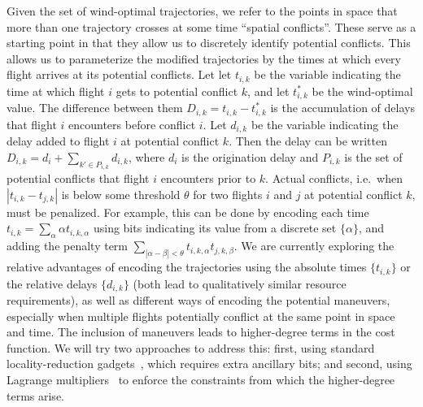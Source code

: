 Given the set of wind-optimal trajectories, we refer to the points in space that more than one trajectory crosses at some time ``spatial conflicts''.
These serve as a starting point in that they allow us to discretely identify potential conflicts.
This allows us to parameterize the modified trajectories by the times at which every flight arrives at its potential conflicts.
Let let $t_{i,k}$ be the variable indicating the time at which flight $i$ gets to potential conflict $k$, and let $t_{i,k}^*$ be the wind-optimal value.
The difference between them $D_{i,k} = t_{i,k} - t^*_{i,k}$ is the accumulation of delays that flight $i$ encounters before conflict $i$.
Let $d_{i,k}$ be the variable indicating the delay added to flight $i$ at potential conflict $k$.
Then the delay can be written $D_{i,k} = d_i + \sum_{k' \in P_{i,k}} d_{i,k}$, where $d_i$ is the origination delay and $P_{i,k}$ is the set of potential conflicts that flight $i$ encounters prior to $k$.
Actual conflicts, i.e.\ when $|t_{i,k} - t_{j,k}|$ is below some threshold $\theta$ for two flights $i$ and $j$ at potential conflict $k$, must be penalized.
For example, this can be done by encoding each time $t_{i,k} = \sum_{\alpha} \alpha t_{i,k,\alpha}$ using bits indicating its value from a discrete set $\{\alpha\}$, and adding the penalty term $\sum_{|\alpha - \beta| < \theta} t_{i,k,\alpha} t_{j,k,\beta}$.
We are currently exploring the relative advantages of encoding the trajectories using the absolute times $\{t_{i,k}\}$ or the relative delays $\{d_{i,k}\}$ (both lead to qualitatively similar resource requirements), as well as different ways of encoding the potential maneuvers, especially when multiple flights potentially conflict at the same point in space and time.
The inclusion of maneuvers leads to higher-degree terms in the cost function.
We will try two approaches to address this: first, using standard locality-reduction gadgets~\cite{babbush:13}, which requires extra ancillary bits; and second, using Lagrange multipliers~\cite{ronagh:15} to enforce the constraints from which the higher-degree terms arise.
